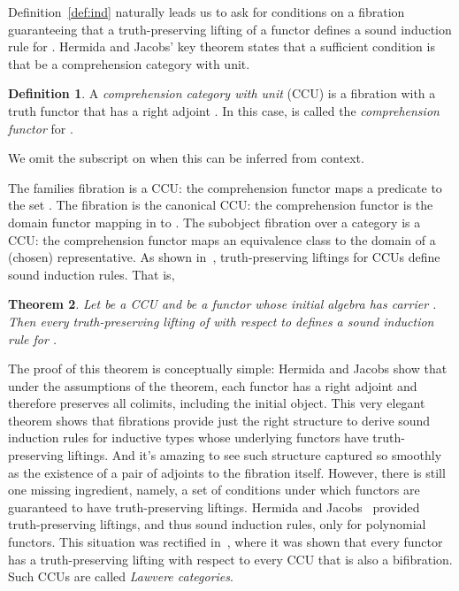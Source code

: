 \documentclass{LMCS}
\theoremstyle{plain}
\newtheorem{theorem}{Theorem}[section]
\theoremstyle{remark}
\theoremstyle{definition}
\newtheorem{definition}[theorem]{Definition}
\begin{document}
Definition~\ref{def:ind} naturally leads us to ask for conditions on a
fibration  guaranteeing that a truth-preserving lifting of a
functor  defines a sound induction rule for . Hermida
and Jacobs' key theorem states that a sufficient condition is that 
be a comprehension category with unit. 

\begin{definition}
  A {\em comprehension category with unit} (CCU) is a fibration  with a truth functor  that has a right adjoint
  . In this case,  is called the {\em comprehension
    functor} for .
\end{definition}
\noindent
We omit the subscript on  when this can be inferred from
context. 

The families fibration is a CCU: the comprehension functor maps a
predicate  to the set .  The
fibration  is the canonical CCU: the comprehension
functor is the domain functor  mapping
 in  to . The subobject fibration over a
category  is a CCU: the comprehension functor maps an equivalence
class to the domain of a (chosen) representative. As shown
in~\cite{hj98}, truth-preserving liftings for CCUs define sound
induction rules. That is,

\begin{theorem}\label{thm:ind}
  Let  be a CCU and  be a functor whose initial
  algebra has carrier . Then every truth-preserving lifting
   of  with respect to  defines a sound induction rule
  for .
\end{theorem}

The proof of this theorem is conceptually simple: Hermida and Jacobs
show that under the assumptions of the theorem, each functor 
has a right adjoint and therefore preserves all colimits, including
the initial object. This very elegant theorem shows that fibrations
provide just the right structure to derive sound induction rules for
inductive types whose underlying functors have truth-preserving
liftings. And it's amazing to see such structure captured so smoothly
as the existence of a pair of adjoints to the fibration
itself. However, there is still one missing ingredient, namely, a set
of conditions under which functors are guaranteed to have
truth-preserving liftings. Hermida and Jacobs~\cite{hj98} provided
truth-preserving liftings, and thus sound induction rules, only for
polynomial functors. This situation was rectified in~\cite{gjf10},
where it was shown that every functor has a truth-preserving lifting
with respect to every CCU that is also a bifibration. Such CCUs are
called {\em Lawvere categories}.
\end{document}
